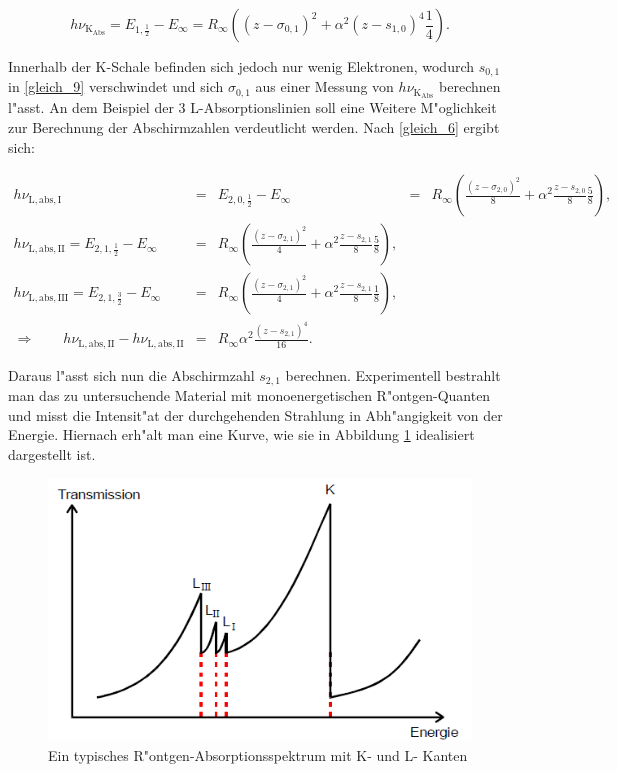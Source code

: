 		\begin{equation}
			h\nu_\mathrm{K}_\mathrm{Abs} = E_{1,\frac{1}{2}} - E_\infty = R_\infty \left( (z - \sigma_{0,1})^2 + \alpha^2 (z-s_{1,0})^4 \frac{1}{4} \right). \label{gleich_11}
		\end{equation}

		Innerhalb der K-Schale befinden sich jedoch nur wenig Elektronen, wodurch $s_{0,1}$ in \ref{gleich_9} verschwindet und sich $\sigma_{0,1}$ aus einer Messung von $h\nu_\mathrm{K}_\mathrm{Abs}$ berechnen l"asst.
		An dem Beispiel der 3 L-Absorptionslinien soll eine Weitere M"oglichkeit zur Berechnung der Abschirmzahlen verdeutlicht werden.
		Nach \ref{gleich_6} ergibt sich:

		\begin{eqnarray*}
			h \nu_\mathrm{L,abs,I} &=& E_{2,0,\frac{1}{2}} - E_\infty &=& R_\infty \left( \frac{(z-\sigma_{2,0})^2}{8} + \alpha^2 \frac{z - s_{2,0}}{8} \frac{5}{8} \right),\\
			h \nu_\mathrm{L,abs,II} = E_{2,1,\frac{1}{2}} - E_\infty &=& R_\infty \left( \frac{(z-\sigma_{2,1})^2}{4} + \alpha^2 \frac{z - s_{2,1}}{8} \frac{5}{8} \right),\\
			h \nu_\mathrm{L,abs,III} = E_{2,1,\frac{3}{2}} - E_\infty &=& R_\infty \left( \frac{(z-\sigma_{2,1})^2}{4} + \alpha^2 \frac{z - s_{2,1}}{8} \frac{1}{8} \right),\\
			\Rightarrow \qquad h\nu_\mathrm{L,abs,II} - h\nu_\mathrm{L,abs,II} &=& R_\infty \alpha^2 \frac{(z - s_{2,1})^4}{16}.
		\end{eqnarray*}

		Daraus l"asst sich nun die Abschirmzahl $s_{2,1}$ berechnen.
		Experimentell bestrahlt man das zu untersuchende Material mit monoenergetischen R"ontgen-Quanten und misst die Intensit"at der durchgehenden Strahlung in Abh"angigkeit von der Energie.
		Hiernach erh"alt man eine Kurve, wie sie in Abbildung \ref{Absorption} idealisiert dargestellt ist.

		\begin{figure}[htbp]
			\centering
			\includegraphics[width = 12cm]{img/absorption.png}
			\caption{Ein typisches R"ontgen-Absorptionsspektrum mit K- und L- Kanten}
			\label{Absorption}
		\end{figure}

